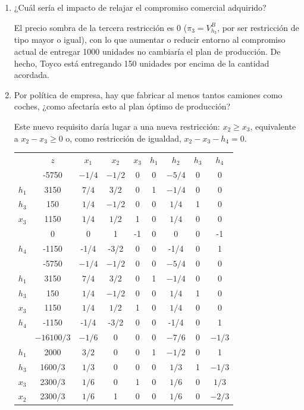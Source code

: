 \begin{enumerate}
    Siempre y cuando se disponga de una cantidad de minutos de montaje igual o superior a 4000 y menor o igual que 17200 la gama de productos sería la misma.

    \item ¿Cuál sería el impacto de relajar el compromiso comercial adquirido?

    El precio sombra de la tercera restricción es 0 ($\pi_3=V^B_{h_3}$, por ser restricción de tipo mayor o igual), con lo que aumentar o reducir entorno al compromiso actual de entregar 1000 unidades no cambiaría el plan de producción. De hecho, Toyco está entregando 150 unidades por encima de la cantidad acordada.

    \item Por política de empresa, hay que fabricar al menos tantos camiones como coches, ¿como afectaría esto al plan óptimo de producción?

    Este nuevo requisito daría lugar a una nueva restricción: $x_2 \geq x_3$, equivalente a $x_2 - x_3 \geq 0$ o, como restricción de igualdad, $x_2 - x_3 - h_4 = 0$.

    \begin{center}
    \begin{tabular}{c|c|ccccccc|}
     & $z$ & $x_1$ & $x_2$ & $x_3$ & $h_1$ & $h_2$ & $h_3$ & $h_4$\\ 
           & -5750 & $-1/4$ & $-1/2$ & 0 & 0 & $-5/4$ & 0 & 0\\ 
    \hline
    $h_1$ & 3150  & $7/4$ & $3/2$ & 0 & 1 & $-1/4$ & 0 & 0\\ 
    $h_3$ & 150  & $1/4$ & $-1/2$ & 0 & 0 & $1/4$ & 1 & 0\\ 
    $x_3$ & 1150  & $1/4$ & $1/2$ & 1 & 0 & $1/4$ & 0 & 0\\ 
    \hline
          & 0     & 0     & 1     &   -1 & 0 & 0 & 0 & -1\\           
    \hline
    $h_4$ & -1150  & -1/4 & -3/2  & 0 & 0 & -1/4  & 0 & 1\\ 
    \hline
          & -5750 & $-1/4$ & $-1/2$ & 0 & 0 & $-5/4$ & 0 & 0\\ 
    \hline
    $h_1$ & 3150  & $7/4$ & $3/2$ & 0 & 1 & $-1/4$ & 0 & 0\\ 
    $h_3$ & 150  & $1/4$ & $-1/2$ & 0 & 0 & $1/4$ & 1 & 0\\ 
    $x_3$ & 1150  & $1/4$ & $1/2$ & 1 & 0 & $1/4$ & 0 & 0\\ 
    $h_4$ & -1150  & -1/4 & -3/2  & 0 & 0 & -1/4  & 0 & 1\\ 
    \hline
          & $-16100/3$ & $-1/6$ & 0 & 0 & 0 & $-7/6$ & 0 & $-1/3$ \\ 
    \hline
    $h_1$ & 2000  & $3/2$ & 0 & 0 & 1 & $-1/2$ & 0 & 1\\ 
    $h_3$ & 1600/3  & $1/3$ & 0 & 0 & 0 & $1/3$ & 1 & $-1/3$\\ 
    $x_3$ & 2300/3  & $1/6$ & 0 & 1 & 0 & $1/6$ & 0 & $1/3$\\ 
    $x_2$ & 2300/3  & $1/6$ & 1 & 0 & 0 & $1/6$ & 0 & $-2/3$\\ 
    \hline
    \end{tabular}
    \end{center}


\end{enumerate}
